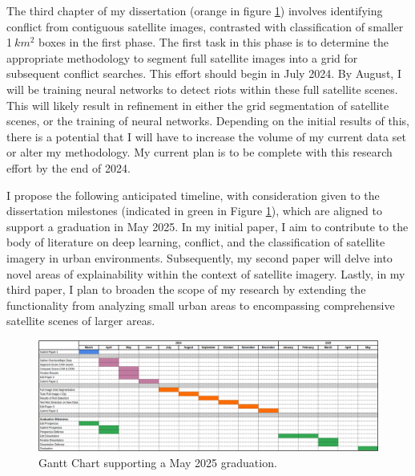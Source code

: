 The third chapter of my dissertation (orange in figure \ref{monthly_gantt_chart}) involves identifying conflict from contiguous satellite images, contrasted with classification of smaller 1\textit{$\ km^{2}$} boxes in the first phase.  The first task in this phase is to determine the appropriate methodology to segment full satellite images into a grid for subsequent conflict searches.  This effort should begin in July 2024.  By August, I will be training neural networks to detect riots within these full satellite scenes.  This will likely result in refinement in either the grid segmentation of satellite scenes, or the training of neural networks.  Depending on the initial results of this, there is a potential that I will have to increase the volume of my current data set or alter my methodology.  My current plan is to be complete with this research effort by the end of 2024.


I propose the following anticipated timeline, with consideration given to the dissertation milestones (indicated in green in Figure \ref{monthly_gantt_chart}), which are aligned to support a graduation in May 2025. In my initial paper, I aim to contribute to the body of literature on deep learning, conflict, and the classification of satellite imagery in urban environments. Subsequently, my second paper will delve into novel areas of explainability within the context of satellite imagery. Lastly, in my third paper, I plan to broaden the scope of my research by extending the functionality from analyzing small urban areas to encompassing comprehensive satellite scenes of larger areas.



\begin{figure}
    \centering
    \includegraphics[width=1\linewidth]{Figures/monthly_gantt_chart.png}
    \caption{Gantt Chart supporting a May 2025 graduation. }
    \label{monthly_gantt_chart}
\end{figure}

